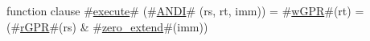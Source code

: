 function clause #\hyperref[zexecute]{execute}# (#\hyperref[zANDI]{ANDI}# (rs, rt, imm)) =
  {
    #\hyperref[zwGPR]{wGPR}#(rt) = (#\hyperref[zrGPR]{rGPR}#(rs) & #\hyperref[zzzerozyextend]{zero\_extend}#(imm))
  }
